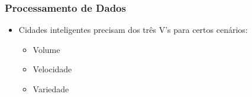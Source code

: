 \begin{frame}
    \frametitle{Processamento de Dados}
    \begin{itemize}
        \item Cidades inteligentes precisam dos três V's para certos cenários:
            \begin{itemize}
                \item Volume
                \item Velocidade
                \item Variedade
            \end{itemize}
    \end{itemize}
\end{frame}
